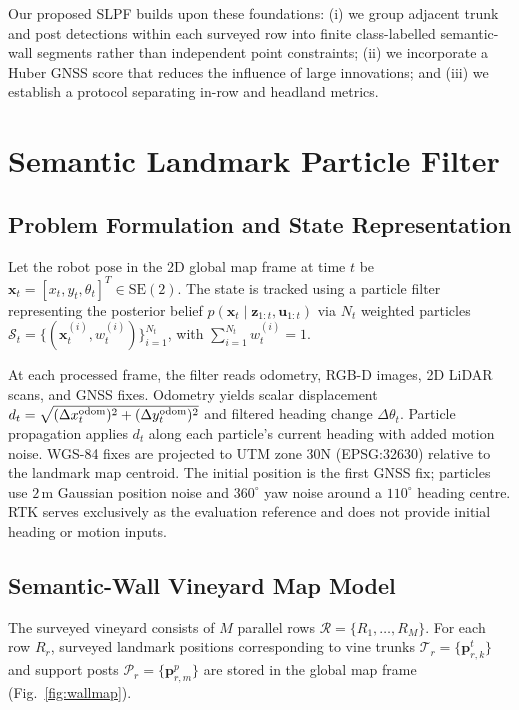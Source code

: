 \documentclass[letterpaper, 10 pt, conference]{ieeeconf}
\begin{document}
Our proposed SLPF builds upon these foundations: (i) we group adjacent trunk and post detections within each surveyed row into finite class-labelled semantic-wall segments rather than independent point constraints; (ii) we incorporate a Huber GNSS score that reduces the influence of large innovations; and (iii) we establish a protocol separating in-row and headland metrics.

\section{Semantic Landmark Particle Filter}
\label{sec:method}

\subsection{Problem Formulation and State Representation}
Let the robot pose in the 2D global map frame at time $t$ be $\mathbf{x}_t = [x_t, y_t, \theta_t]^T \in \mathrm{SE}(2)$. The state is tracked using a particle filter representing the posterior belief $p(\mathbf{x}_t \mid \mathbf{z}_{1:t}, \mathbf{u}_{1:t})$ via $N_t$ weighted particles $\mathcal{S}_t = \{(\mathbf{x}_t^{(i)}, w_t^{(i)})\}_{i=1}^{N_t}$, with $\sum_{i=1}^{N_t} w_t^{(i)} = 1$.

At each processed frame, the filter reads odometry, RGB-D images, 2D LiDAR scans, and GNSS fixes. Odometry yields scalar displacement $d_t=\sqrt{(\Delta x_t^{\rm odom})^2+(\Delta y_t^{\rm odom})^2}$ and filtered heading change $\Delta\theta_t$. Particle propagation applies $d_t$ along each particle's current heading with added motion noise. WGS-84 fixes are projected to UTM zone 30N (EPSG:32630) relative to the landmark map centroid. The initial position is the first GNSS fix; particles use $2\,$m Gaussian position noise and $360^\circ$ yaw noise around a $110^\circ$ heading centre. RTK serves exclusively as the evaluation reference and does not provide initial heading or motion inputs.

\subsection{Semantic-Wall Vineyard Map Model}
The surveyed vineyard consists of $M$ parallel rows $\mathcal{R} = \{R_1, \dots, R_M\}$. For each row $R_r$, surveyed landmark positions corresponding to vine trunks $\mathcal{T}_r = \{\mathbf{p}_{r,k}^t\}$ and support posts $\mathcal{P}_r = \{\mathbf{p}_{r,m}^p\}$ are stored in the global map frame (Fig.~\ref{fig:wallmap}).
\end{document}
